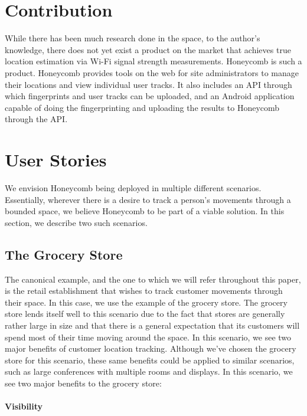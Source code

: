  
\section{Contribution}
%

While there has been much research done in the space, to the author's knowledge, there does not yet exist a product on the market that achieves true location estimation via Wi-Fi signal strength measurements. Honeycomb is such a product. Honeycomb provides tools on the web for site administrators to manage their locations and view individual user tracks. It also includes an API through which fingerprints and user tracks can be uploaded, and an Android application capable of doing the fingerprinting and uploading the results to Honeycomb through the API. 


\section{User Stories}
%

We envision Honeycomb being deployed in multiple different scenarios. Essentially, wherever there is a desire to track a person's movements through a bounded space, we believe Honeycomb to be part of a viable solution. In this section, we describe two such scenarios.

\subsection{The Grocery Store}
The canonical example, and the one to which we will refer throughout this paper, is the retail establishment that wishes to track customer movements through their space. In this case, we use the example of the grocery store. The grocery store lends itself well to this scenario due to the fact that stores are generally rather large in size and that there is a general expectation that its customers will spend most of their time moving around the space. In this scenario, we see two major benefits of customer location tracking.  Although we've chosen the grocery store for this scenario, these same benefits could be applied to similar scenarios, such as large conferences with multiple rooms and displays. In this scenario, we see two major benefits to the grocery store: 

\paragraph{Visibility}

